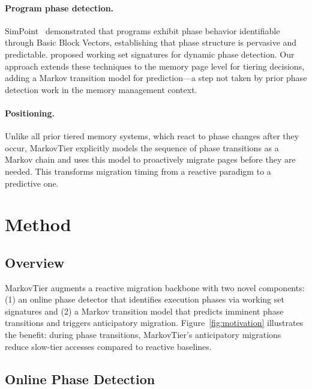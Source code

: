 \documentclass[preprint]{article}
\begin{document}
\paragraph{Program phase detection.}
SimPoint~\citep{sherwood2002simpoint} demonstrated that programs exhibit phase behavior identifiable through Basic Block Vectors, establishing that phase structure is pervasive and predictable. \citet{dhodapkar2002working} proposed working set signatures for dynamic phase detection. Our approach extends these techniques to the memory page level for tiering decisions, adding a Markov transition model for prediction---a step not taken by prior phase detection work in the memory management context.

\paragraph{Positioning.}
Unlike all prior tiered memory systems, which react to phase changes after they occur, MarkovTier explicitly models the sequence of phase transitions as a Markov chain and uses this model to proactively migrate pages before they are needed. This transforms migration timing from a reactive paradigm to a predictive one.

\section{Method}
\label{sec:method}

\subsection{Overview}

MarkovTier augments a reactive migration backbone with two novel components: (1) an online phase detector that identifies execution phases via working set signatures and (2) a Markov transition model that predicts imminent phase transitions and triggers anticipatory migration. Figure~\ref{fig:motivation} illustrates the benefit: during phase transitions, MarkovTier's anticipatory migrations reduce slow-tier accesses compared to reactive baselines.

\subsection{Online Phase Detection}
\label{sec:phase_detection}
\end{document}

